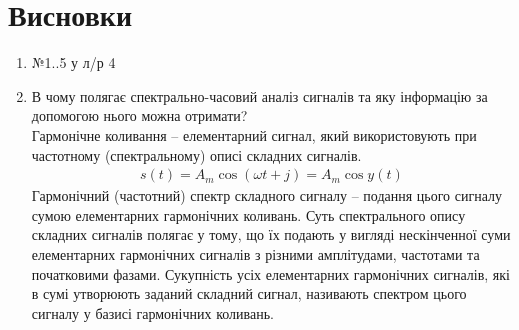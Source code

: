 \section{Висновки}
\label{sec:summary}

\begin{enumerate}
      \item №1..5 у л/р 4
      \item В чому полягає спектрально-часовий аналіз сигналів та яку
            інформацію за допомогою нього можна отримати? \\
            Гармонічне коливання – елементарний сигнал, який використовують
            при частотному (спектральному) описі складних сигналів.
            \begin{align}
                  s(t) = A_m \cos (\omega t + j) = A_m \cos y (t)
            \end{align}
            Гармонічний (частотний) спектр складного сигналу
            – подання цього сигналу сумою елементарних гармонічних коливань.
            Суть спектрального опису складних сигналів полягає у тому,
            що їх подають у вигляді нескінченної суми елементарних гармонічних
            сигналів з різними амплітудами, частотами та початковими фазами.
            Сукупність усіх елементарних гармонічних сигналів,
            які в сумі утворюють заданий складний сигнал,
            називають спектром цього сигналу у базисі гармонічних коливань.
\end{enumerate}
